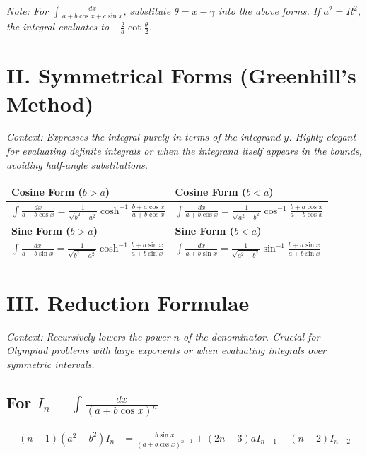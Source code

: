 \documentclass[11pt, a4paper]{article}
\begin{document}
\vspace{0.2cm}

\textit{\small Note: For $\int \frac{dx}{a+b\cos x+c\sin x}$, substitute $\theta = x-\gamma$ into the above forms. If $a^2 = R^2$, the integral evaluates to $-\frac{2}{a} \cot \frac{\theta}{2}$.}

\section*{\color{primary} II. Symmetrical Forms (Greenhill's Method)}

\textit{\small Context: Expresses the integral purely in terms of the integrand $y$. Highly elegant for evaluating definite integrals or when the integrand itself appears in the bounds, avoiding half-angle substitutions.}

\begin{center}
\begin{tabular}{@{}p{} p{}@{}}
\toprule
\textbf{Cosine Form ($b > a$)} & \textbf{Cosine Form ($b < a$)} \\
\midrule
$\int \frac{dx}{a+b\cos x} = \frac{1}{\sqrt{b^2-a^2}} \cosh^{-1} \frac{b+a\cos x}{a+b\cos x}$ & $\int \frac{dx}{a+b\cos x} = \frac{1}{\sqrt{a^2-b^2}} \cos^{-1} \frac{b+a\cos x}{a+b\cos x}$ \\
\midrule
\textbf{Sine Form ($b > a$)} & \textbf{Sine Form ($b < a$)} \\
\midrule
$\int \frac{dx}{a+b\sin x} = \frac{1}{\sqrt{b^2-a^2}} \cosh^{-1} \frac{b+a\sin x}{a+b\sin x}$ & $\int \frac{dx}{a+b\sin x} = \frac{1}{\sqrt{a^2-b^2}} \sin^{-1} \frac{b+a\sin x}{a+b\sin x}$ \\
\bottomrule
\end{tabular}
\end{center}


\section*{\color{primary} III. Reduction Formulae}

\textit{\small Context: Recursively lowers the power $n$ of the denominator. Crucial for Olympiad problems with large exponents or when evaluating integrals over symmetric intervals.}

\subsection*{\color{secondary} For $I_n = \int \frac{dx}{(a+b\cos x)^n}$}
\begin{align*}
    (n-1)(a^2-b^2) I_n &= \frac{b \sin x}{(a+b\cos x)^{n-1}} + (2n-3)a I_{n-1} - (n-2) I_{n-2}
\end{align*}
\end{document}
